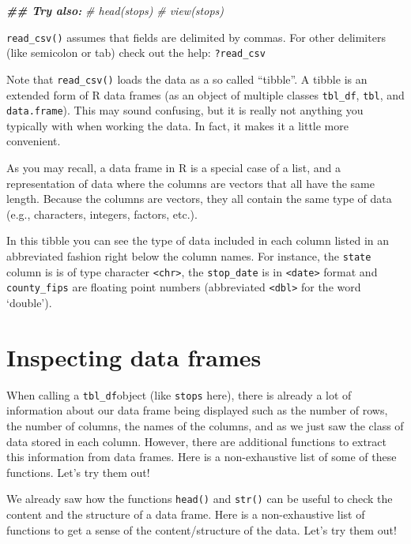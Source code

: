 \documentclass[
]{book}
\newenvironment{Shaded}{\begin{snugshade}}{\end{snugshade}}
\newcommand{\CommentTok}[1]{\textcolor[rgb]{0.56,0.35,0.01}{\textit{#1}}}
\newcommand{\DocumentationTok}[1]{\textcolor[rgb]{0.56,0.35,0.01}{\textbf{\textit{#1}}}}
\begin{document}
\begin{Shaded}
\begin{Highlighting}[]
\DocumentationTok{\#\# Try also:}
\CommentTok{\# head(stops)}
\CommentTok{\# view(stops)}
\end{Highlighting}
\end{Shaded}

\texttt{read\_csv()} assumes that fields are delimited by commas. For other delimiters (like semicolon or tab) check out the help: \texttt{?read\_csv}

Note that \texttt{read\_csv()} loads the data as a so called ``tibble''. A tibble is an extended form of R data frames (as an object of multiple classes \texttt{tbl\_df}, \texttt{tbl}, and \texttt{data.frame}). This may sound confusing, but it is really not anything you typically with when working the data. In fact, it makes it a little more convenient.

As you may recall, a data frame in R is a special case of a list, and a representation of data where the columns are vectors that all have the same length. Because the columns are vectors, they all contain the same type of data (e.g., characters, integers, factors, etc.).

In this tibble you can see the type of data included in each column listed in an abbreviated fashion right below the column names. For instance, the \texttt{state} column is is of type character \texttt{\textless{}chr\textgreater{}}, the \texttt{stop\_date} is in \texttt{\textless{}date\textgreater{}} format and \texttt{county\_fips} are floating point numbers (abbreviated \texttt{\textless{}dbl\textgreater{}} for the word `double').

\hypertarget{inspecting-data-frames}{%
\section{Inspecting data frames}\label{inspecting-data-frames}}

When calling a \texttt{tbl\_df}object (like \texttt{stops} here), there is already a lot of information about our data frame being displayed such as the number of rows, the number of columns, the names of the columns, and as we just saw the class of data stored in each column. However, there are additional functions to extract this information from data frames. Here is a non-exhaustive list of some of these functions. Let's try them out!

We already saw how the functions \texttt{head()} and \texttt{str()} can be useful to check the
content and the structure of a data frame. Here is a non-exhaustive list of
functions to get a sense of the content/structure of the data. Let's try them out!
\end{document}
